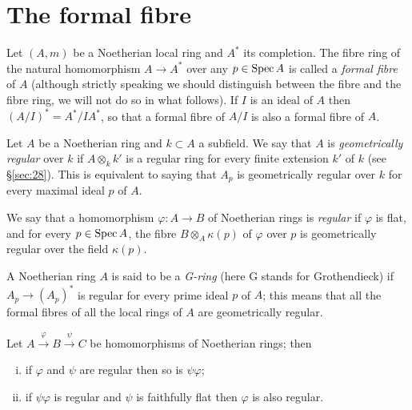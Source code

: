 \section{The formal fibre}\label{sec:32}

Let $(A, m)$ be a Noetherian local ring and $A^*$ its completion. The fibre ring of
the natural homomorphism $A \to A^*$ over any $p \in \operatorname{Spec} A$ is called a \emph{formal
fibre} of $A$ (although strictly speaking we should distinguish between the fibre
and the fibre ring, we will not do so in what follows). If $I$ is an ideal of $A$
then $(A/I)^* = A^*/IA^*$, so that a formal fibre of $A/I$ is also a formal fibre of
$A$.

Let $A$ be a Noetherian ring and $k \subset A$ a subfield. We say that $A$ is
\emph{geometrically regular} over $k$ if $A \otimes_k k'$ is a regular ring for every finite
extension $k'$ of $k$ (see \S\ref{sec:28}). This is equivalent to saying that $A_p$ is
geometrically regular over $k$ for every maximal ideal $p$ of $A$.

We say that a homomorphism $\varphi\colon A \to B$ of Noetherian rings is \emph{regular} if
$\varphi$ is flat, and for every $p \in \operatorname{Spec} A$, the fibre $B \otimes_A \kappa(p)$ of $\varphi$ over $p$
is geometrically regular over the field $\kappa(p)$.

A Noetherian ring $A$ is said to be a \emph{G-ring} (here G stands for Grothendieck)
if $A_p \to (A_p)^*$ is regular for every prime ideal $p$ of $A$; this means that all the
formal fibres of all the local rings of $A$ are geometrically regular.

\begin{theorem}\label{thm:32.1}
Let $A \xrightarrow{\varphi} B \xrightarrow{\psi} C$ be homomorphisms of Noetherian rings;
then
\begin{enumerate}[(i)]
  \item if $\varphi$ and $\psi$ are regular then so is $\psi\varphi$;
  \item if $\psi\varphi$ is regular and $\psi$ is faithfully flat then $\varphi$ is also regular.
\end{enumerate}
\end{theorem}


